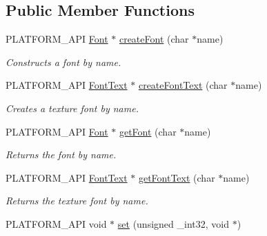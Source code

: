 \subsection*{Public Member Functions}
\begin{DoxyCompactItemize}
\item 
\hypertarget{classcsad_1_1_font_server_a0dced757a18a02ea8c5894c9405e51b7}{P\-L\-A\-T\-F\-O\-R\-M\-\_\-\-A\-P\-I \hyperlink{classcsad_1_1_font}{Font} $\ast$ \hyperlink{classcsad_1_1_font_server_a0dced757a18a02ea8c5894c9405e51b7}{create\-Font} (char $\ast$name)}\label{classcsad_1_1_font_server_a0dced757a18a02ea8c5894c9405e51b7}

\begin{DoxyCompactList}\small\item\em Constructs a font by name. \end{DoxyCompactList}\item 
\hypertarget{classcsad_1_1_font_server_a63cb0951903f8e34302f443a011aabac}{P\-L\-A\-T\-F\-O\-R\-M\-\_\-\-A\-P\-I \hyperlink{classcsad_1_1_font_text}{Font\-Text} $\ast$ \hyperlink{classcsad_1_1_font_server_a63cb0951903f8e34302f443a011aabac}{create\-Font\-Text} (char $\ast$name)}\label{classcsad_1_1_font_server_a63cb0951903f8e34302f443a011aabac}

\begin{DoxyCompactList}\small\item\em Creates a texture font by name. \end{DoxyCompactList}\item 
\hypertarget{classcsad_1_1_font_server_a9a526980241ce80c3416295327c92b30}{P\-L\-A\-T\-F\-O\-R\-M\-\_\-\-A\-P\-I \hyperlink{classcsad_1_1_font}{Font} $\ast$ \hyperlink{classcsad_1_1_font_server_a9a526980241ce80c3416295327c92b30}{get\-Font} (char $\ast$name)}\label{classcsad_1_1_font_server_a9a526980241ce80c3416295327c92b30}

\begin{DoxyCompactList}\small\item\em Returns the font by name. \end{DoxyCompactList}\item 
\hypertarget{classcsad_1_1_font_server_a5ffcda094dc56c7ef068960bf6f03a04}{P\-L\-A\-T\-F\-O\-R\-M\-\_\-\-A\-P\-I \hyperlink{classcsad_1_1_font_text}{Font\-Text} $\ast$ \hyperlink{classcsad_1_1_font_server_a5ffcda094dc56c7ef068960bf6f03a04}{get\-Font\-Text} (char $\ast$name)}\label{classcsad_1_1_font_server_a5ffcda094dc56c7ef068960bf6f03a04}

\begin{DoxyCompactList}\small\item\em Returns the texture font by name. \end{DoxyCompactList}\item 
\hypertarget{classcsad_1_1_font_server_a34f907f08e1fd2dda02c1358590a1ffc}{P\-L\-A\-T\-F\-O\-R\-M\-\_\-\-A\-P\-I void $\ast$ \hyperlink{classcsad_1_1_font_server_a34f907f08e1fd2dda02c1358590a1ffc}{set} (unsigned \-\_\-int32, void $\ast$)}\label{classcsad_1_1_font_server_a34f907f08e1fd2dda02c1358590a1ffc}


\end{DoxyCompactItemize}
